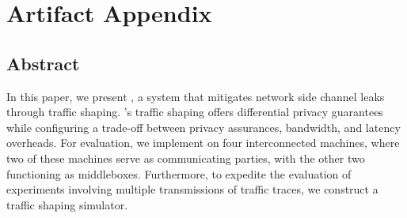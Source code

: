 
\appendix
\section{Artifact Appendix}
\subsection{Abstract}
In this paper, we present {\sys}, a system that mitigates network side channel leaks through traffic shaping. {\sys}'s traffic shaping offers differential privacy guarantees while configuring a trade-off between privacy assurances, bandwidth, and latency overheads. For evaluation, we implement {\sys} on four interconnected machines, where two of these machines serve as communicating parties, with the other two functioning as middleboxes. Furthermore, to expedite the evaluation of experiments involving multiple transmissions of traffic traces, we construct a traffic shaping simulator.





